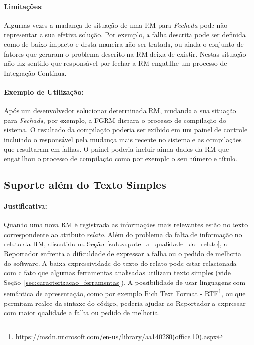 \paragraph{Limitações:}
\label{par:limitacoes_s05}

Algumas vezes a mudança de situação de uma RM para \textit{Fechada} pode não
representar a sua efetiva solução. Por exemplo, a falha descrita pode ser
definida como de baixo impacto e desta maneira não ser tratada, ou ainda o
conjunto de fatores que geraram o problema descrito na RM deixa de existir.
Nestas situação não faz sentido que responsável por fechar a RM engatilhe um
processo de Integração Contínua.

\paragraph{Exemplo de Utilização:}
\label{par:exemplo_de_utilização_s05}

Após um desenvolvedor solucionar determinada RM, mudando a sua situação para
\textit{Fechada}, por exemplo, a FGRM dispara o processo de compilação do
sistema. O resultado da compilação poderia ser exibido em um painel de controle
incluindo o responsável pela mudança mais recente no sistema e as compilações
que resultaram em falhas. O painel poderia incluir ainda dados da RM que
engatilhou o processo de compilação como por exemplo o seu número e título.

\subsection{Suporte além do Texto Simples}
\label{sub:suporte_linguagem_marcacao}


\paragraph{Justificativa:}
\label{par:justificativa_s06}

Quando uma nova RM é registrada as informações mais relevantes estão no texto
correspondente ao atributo \textit{relato}. Além do problema da falta de
informação no relato da RM, discutido na
Seção~\ref{sub:supote_a_qualidade_do_relato}, o Reportador enfrenta a
dificuldade de expressar a falha ou o pedido de melhoria do software. A baixa
expressividade do texto do relato pode estar relacionada com o fato que algumas
ferramentas analisadas utilizam texto simples (vide
Seção~\ref{sec:caracterizacao_ferramentas}). A possibilidade de usar linguagens
com semântica de apresentação, como por exemplo Rich Text Format \@-\@
RTF\footnote{\url{https://msdn.microsoft.com/en-us/library/aa140280(office.10).aspx}},
ou que permitam realce da sintaxe do código, poderia ajudar ao Reportador a
expressar com maior qualidade a falha ou pedido de melhoria.

